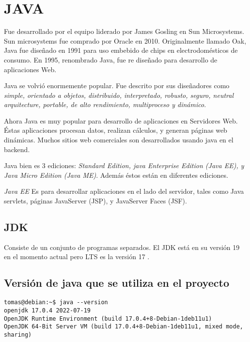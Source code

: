 \chapter{JAVA}
Fue desarrollado por el equipo liderado por James Gosling en Sun Microsystems. Sun microsystems fue comprado por Oracle en 2010. Originalmente llamado Oak, Java fue diseñado en 1991 para uso embebido de chips en electrodomésticos de consumo. En 1995, renombrado Java, fue re diseñado para desarrollo de aplicaciones Web. 

Java se volvió enormemente popular. Fue descrito por sus diseñadores como \textit{ simple, orientado a objetos, distribuido, interpretado, robusto, seguro, neutral arquitecture, portable, de alto rendimiento, multiproceso y dinámico}.

Ahora Java es muy popular para desarrollo de aplicaciones en Servidores Web. Éstas aplicaciones procesan datos, realizan cálculos, y generan páginas web dinámicas. Muchos sitios web comerciales son desarrollados usando java en el backend. 

Java bien es 3 ediciones: \textit{Standard Edition, java Enterprise Edition (Java EE), y Java Micro Edition (Java ME)}. Además éstos están en diferentes ediciones.

\textit{ Java EE} Es para desarrollar aplicaciones en el lado del servidor, tales como Java servlets, páginas JavaServer (JSP), y JavaServer Faces (JSF).

\section{JDK}
Consiste de un conjunto de programas separados. El JDK está en su versión 19 en el momento actual pero LTS es la versión 17 \cite{historia}. 

\section{Versión de java que se utiliza en el proyecto}
\begin{verbatim}
tomas@debian:~$ java --version
openjdk 17.0.4 2022-07-19
OpenJDK Runtime Environment (build 17.0.4+8-Debian-1deb11u1)
OpenJDK 64-Bit Server VM (build 17.0.4+8-Debian-1deb11u1, mixed mode, sharing)
\end{verbatim}







